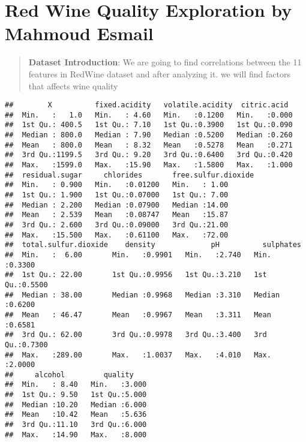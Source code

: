\documentclass[]{article}
\title{}
\author{}
\date{}
\begin{document}
\section{Red Wine Quality Exploration by Mahmoud
Esmail}\label{red-wine-quality-exploration-by-mahmoud-esmail}

\begin{quote}
\textbf{Dataset Introduction}: We are going to find correlations between
the 11 features in RedWine dataset and after analyzing it. we will find
factors that affects wine quality
\end{quote}

\begin{verbatim}
##        X          fixed.acidity   volatile.acidity  citric.acid   
##  Min.   :   1.0   Min.   : 4.60   Min.   :0.1200   Min.   :0.000  
##  1st Qu.: 400.5   1st Qu.: 7.10   1st Qu.:0.3900   1st Qu.:0.090  
##  Median : 800.0   Median : 7.90   Median :0.5200   Median :0.260  
##  Mean   : 800.0   Mean   : 8.32   Mean   :0.5278   Mean   :0.271  
##  3rd Qu.:1199.5   3rd Qu.: 9.20   3rd Qu.:0.6400   3rd Qu.:0.420  
##  Max.   :1599.0   Max.   :15.90   Max.   :1.5800   Max.   :1.000  
##  residual.sugar     chlorides       free.sulfur.dioxide
##  Min.   : 0.900   Min.   :0.01200   Min.   : 1.00      
##  1st Qu.: 1.900   1st Qu.:0.07000   1st Qu.: 7.00      
##  Median : 2.200   Median :0.07900   Median :14.00      
##  Mean   : 2.539   Mean   :0.08747   Mean   :15.87      
##  3rd Qu.: 2.600   3rd Qu.:0.09000   3rd Qu.:21.00      
##  Max.   :15.500   Max.   :0.61100   Max.   :72.00      
##  total.sulfur.dioxide    density             pH          sulphates     
##  Min.   :  6.00       Min.   :0.9901   Min.   :2.740   Min.   :0.3300  
##  1st Qu.: 22.00       1st Qu.:0.9956   1st Qu.:3.210   1st Qu.:0.5500  
##  Median : 38.00       Median :0.9968   Median :3.310   Median :0.6200  
##  Mean   : 46.47       Mean   :0.9967   Mean   :3.311   Mean   :0.6581  
##  3rd Qu.: 62.00       3rd Qu.:0.9978   3rd Qu.:3.400   3rd Qu.:0.7300  
##  Max.   :289.00       Max.   :1.0037   Max.   :4.010   Max.   :2.0000  
##     alcohol         quality     
##  Min.   : 8.40   Min.   :3.000  
##  1st Qu.: 9.50   1st Qu.:5.000  
##  Median :10.20   Median :6.000  
##  Mean   :10.42   Mean   :5.636  
##  3rd Qu.:11.10   3rd Qu.:6.000  
##  Max.   :14.90   Max.   :8.000
\end{verbatim}
\end{document}
